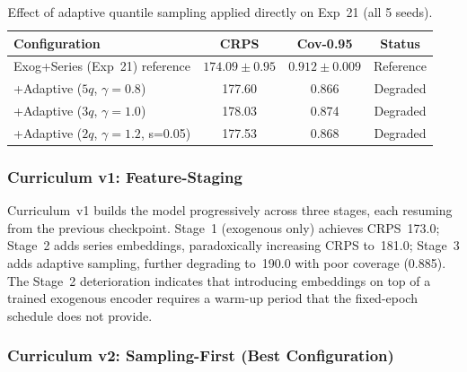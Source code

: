 \begin{table}[H]
\centering
\caption{Effect of adaptive quantile sampling applied directly on Exp~21
  (all 5 seeds).}
\label{tab:adaptive}
\begin{tabular}{lccc}
\toprule
\textbf{Configuration} & \textbf{CRPS} & \textbf{Cov-0.95} & \textbf{Status} \\
\midrule
Exog+Series (Exp~21) reference           & $174.09\pm0.95$ & $0.912\pm0.009$ & Reference \\
+Adaptive ($5q$, $\gamma{=}0.8$)         & 177.60          & 0.866           & Degraded  \\
+Adaptive ($3q$, $\gamma{=}1.0$)         & 178.03          & 0.874           & Degraded  \\
+Adaptive ($2q$, $\gamma{=}1.2$, s=0.05) & 177.53         & 0.868           & Degraded  \\
\bottomrule
\end{tabular}
\end{table}

\subsubsection{Curriculum v1: Feature-Staging}

Curriculum~v1 builds the model progressively across three stages, each
resuming from the previous checkpoint.
Stage~1 (exogenous only) achieves CRPS~173.0; Stage~2 adds series
embeddings, paradoxically increasing CRPS to~181.0; Stage~3 adds
adaptive sampling, further degrading to~190.0 with poor coverage (0.885).
The Stage~2 deterioration indicates that introducing embeddings on top of
a trained exogenous encoder requires a warm-up period that the fixed-epoch
schedule does not provide.

\subsubsection{Curriculum v2: Sampling-First (Best Configuration)}
\label{subsubsec:curriculum_v2}

